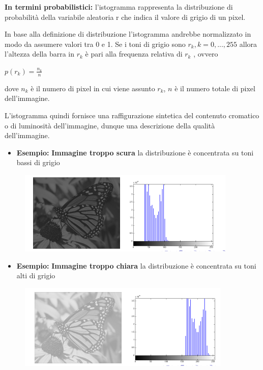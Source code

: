 \textbf{In termini probabilistici:} l'istogramma rappresenta la distribuzione di probabilità della variabile aleatoria r che indica il
valore di grigio di un pixel.

\begin{definition}
    In base alla definizione di distribuzione l'istogramma andrebbe normalizzato in modo da assumere valori tra 0 e 1.
    Se i toni di grigio sono $r_k, k = 0, . . . , 255$ allora l'altezza della barra in $r_k$ è pari alla frequenza relativa di $r_k$ , ovvero
    \begin{center}
        $p(r_k) = \frac{n_k}{n}$
    \end{center}
    dove $n_k$ è il numero di pixel in cui viene assunto $r_k$, $n$ è il numero totale di pixel dell'immagine.
\end{definition}

L'istogramma quindi fornisce una raffigurazione sintetica del contenuto cromatico o di luminosità dell'immagine, dunque una descrizione
della qualità dell'immagine.

\begin{itemize}
    \item \textbf{Esempio:} \textbf{Immagine troppo scura}
          la distribuzione è concentrata su toni bassi di grigio
\end{itemize}

\begin{figure}[H]
    \centering
    \includegraphics[width=\linewidth, keepaspectratio]{capitoli/immagini/imgs/isto-scuro.png}
\end{figure}

\begin{itemize}
    \item \textbf{Esempio:} \textbf{Immagine troppo chiara}
          la distribuzione è concentrata su toni alti di grigio
\end{itemize}

\begin{figure}[H]
    \centering
    \includegraphics[width=\linewidth, keepaspectratio]{capitoli/immagini/imgs/isto-chiaro.png}
\end{figure}

